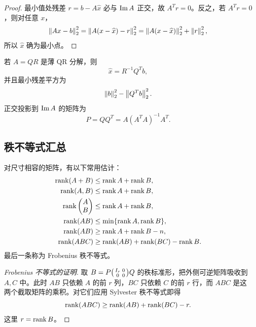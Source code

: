 \begin{proof}
最小值处残差 $r=b-A\widehat x$ 必与 $\operatorname{Im} A$ 正交，故 $A^Tr=0$。反之，若 $A^Tr=0$，则对任意 $x$，
\begin{equation}
 \left\lVert Ax-b\right\rVert_2^2
 =\left\lVert A(x-\widehat x)-r\right\rVert_2^2
 =\left\lVert A(x-\widehat x)\right\rVert_2^2+\left\lVert r\right\rVert_2^2,
\end{equation}
所以 $\widehat x$ 确为最小点。
\end{proof}

\begin{corollary}[QR 求解]
若 $A=QR$ 是薄 QR 分解，则
\begin{equation}
 \widehat x=R^{-1}Q^Tb,
\end{equation}
并且最小残差平方为
\begin{equation}
 \left\lVert b\right\rVert_2^2-\left\lVert Q^Tb\right\rVert_2^2.
\end{equation}
正交投影到 $\operatorname{Im} A$ 的矩阵为
\begin{equation}
 P=QQ^T=A(A^TA)^{-1}A^T.
\end{equation}
\end{corollary}

\subsection{秩不等式汇总}

对尺寸相容的矩阵，有以下常用估计：
\begin{align}
 \operatorname{rank}(A+B)&\leq\operatorname{rank} A+\operatorname{rank} B,\\
 \operatorname{rank}(A,B)&\leq\operatorname{rank} A+\operatorname{rank} B,\\
 \operatorname{rank}\begin{pmatrix}A\\B\end{pmatrix}
 &\leq\operatorname{rank} A+\operatorname{rank} B,\\
 \operatorname{rank}(AB)&\leq\min\{\operatorname{rank} A,\operatorname{rank} B\},\\
 \operatorname{rank}(AB)&\geq\operatorname{rank} A+\operatorname{rank} B-n,\\
 \operatorname{rank}(ABC)&\geq\operatorname{rank}(AB)+\operatorname{rank}(BC)-\operatorname{rank} B.
\end{align}
最后一条称为 Frobenius 秩不等式。

\begin{proof}[Frobenius 不等式的证明]
取 $B=P\begin{psmallmatrix}I_r&0\\0&0\end{psmallmatrix}Q$ 的秩标准形，把外侧可逆矩阵吸收到 $A,C$ 中。此时 $AB$ 只依赖 $A$ 的前 $r$ 列，$BC$ 只依赖 $C$ 的前 $r$ 行，而 $ABC$ 是这两个截取矩阵的乘积。对它们应用 Sylvester 秩不等式即得
\begin{equation}
 \operatorname{rank}(ABC)\geq\operatorname{rank}(AB)+\operatorname{rank}(BC)-r.
\end{equation}
这里 $r=\operatorname{rank} B$。
\end{proof}

